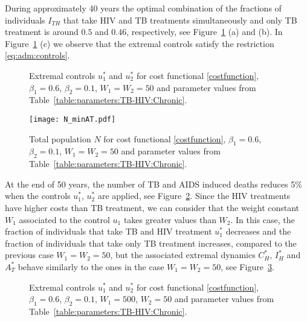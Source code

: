 \documentclass{my_aims}
\theoremstyle{definition}
\begin{document}
During approximately 40 years the optimal combination of the fractions of individuals $I_{TH}$
that take HIV and TB treatments simultaneously and only TB treatment is around $0.5$ and $0.46$,
respectively, see Figure~\ref{fig:u1:u2:minAT} (a) and (b). In Figure~\ref{fig:u1:u2:minAT} (c)
we observe that the extremal controls satisfy the restriction \eqref{eq:adm:controls}.
\begin{figure}[!htb]
\centering
{}
\caption{Extremal controls $u_1^*$ and $u_2^*$ for cost functional \eqref{costfunction},
$\beta_1 = 0.6$, $\beta_2 = 0.1$, $W_1 = W_2 = 50$ and parameter values
from Table~\ref{table:parameters:TB-HIV:Chronic}.}
\label{fig:u1:u2:minAT}
\end{figure}
\begin{figure}[!htb]
\centering
\texttt{[image: N\_minAT.pdf]}
\caption{Total population $N$ for cost functional \eqref{costfunction},
$\beta_1 = 0.6$, $\beta_2 = 0.1$, $W_1 = W_2 = 50$ and parameter values
from Table~\ref{table:parameters:TB-HIV:Chronic}.}
\label{N:minAT}
\end{figure}
At the end of 50 years, the number of TB and AIDS induced deaths reduces 5\% when the controls
$u_1^*$, $u_2^*$ are applied, see Figure~\ref{N:minAT}.
Since the HIV treatments have higher costs than TB treatment, we can consider that the weight
constant $W_1$ associated to the control $u_1$ takes greater values than $W_2$. In this case,
the fraction of individuals that take TB and HIV treatment $u_1^*$ decreases and the fraction
of individuals that take only TB treatment increases, compared to the previous case $W_1 = W_2 = 50$,
but the associated extremal dynamics $C_H^*$, $I_H^*$ and $A_T^*$ behave similarly to the ones
in the case $W_1 = W_2 = 50$, see Figure~\ref{fig:u1:u2:minAT:W1:500}.
\begin{figure}[!htb]
\centering
{}
\caption{Extremal controls $u_1^*$ and $u_2^*$ for cost functional \eqref{costfunction},
$\beta_1 = 0.6$, $\beta_2 = 0.1$, $W_1 =500$, $W_2 = 50$ and parameter values
from Table~\ref{table:parameters:TB-HIV:Chronic}.}
\label{fig:u1:u2:minAT:W1:500}
\end{figure}
\end{document}
